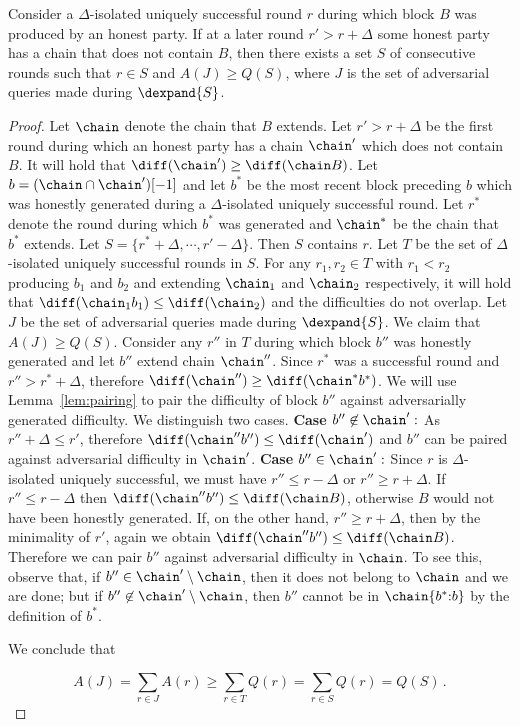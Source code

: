 \begin{lemma}\label{lem:suppression}
  Consider a $\Delta$-isolated uniquely successful round $r$ during which block
  $B$ was produced by an honest party. If at a later round $r' > r + \Delta$
  some honest party has a chain that does not contain $B$, then there exists
  a set $S$ of consecutive rounds such that
  $r \in S$
  and $A(J) \geq Q(S)$, where $J$ is the set of adversarial queries made
  during $\dexpand{S}$.
\end{lemma}
\begin{proof}
  Let $\chain$ denote the chain that $B$ extends.
  Let $r' > r + \Delta$ be the first round during which an honest party has a
  chain $\chain'$ which does not contain $B$.
  It will hold that $\diff(\chain') \geq \diff(\chain B)$.
  Let
  $b = (\chain \cap \chain')[-1]$ and let $b^*$ be the most recent block
  preceding $b$ which was honestly generated during a $\Delta$-isolated uniquely
  successful round.
  Let $r^*$ denote the round during which $b^*$ was generated
  and $\chain^*$ be the chain that $b^*$ extends.
  Let $S = \{r^* + \Delta, \cdots, r' - \Delta\}$.
  Then $S$ contains $r$.
  Let $T$ be the set of $\Delta$-isolated uniquely successful rounds in
  $S$. For any $r_1, r_2 \in T$ with $r_1 < r_2$ producing $b_1$ and $b_2$ and
  extending $\chain_1$ and $\chain_2$ respectively, it will hold that
  $\diff(\chain_1 b_1) \leq \diff(\chain_2)$ and the difficulties do not
  overlap.
  Let $J$ be the set of adversarial queries made during $\dexpand{S}$.
  We claim that $A(J) \geq Q(S)$.
  Consider any $r''$ in $T$
  during which block $b''$ was honestly generated and let $b''$ extend chain $\chain''$.
  Since $r^*$ was a successful round and $r'' > r^* + \Delta$, therefore
  $\diff(\chain'') \geq \diff(\chain^* b^*)$.
  We will use Lemma~\ref{lem:pairing} to pair the difficulty of block $b''$
  against adversarially generated difficulty.
  We distinguish two cases.
  \textbf{Case $b'' \not\in \chain':$} As $r'' + \Delta \leq r'$, therefore
  $\diff(\chain''b'') \leq \diff(\chain')$ and $b''$ can be paired against
  adversarial difficulty in $\chain'$.
  \textbf{Case $b'' \in \chain':$}
  Since $r$ is $\Delta$-isolated uniquely successful, we must have
  $r'' \leq r - \Delta$ or $r'' \geq r + \Delta$.
  If $r'' \leq r - \Delta$ then $\diff(\chain'' b'') \leq \diff(\chain B)$,
  otherwise $B$ would not have been honestly generated.
  If, on the other hand, $r'' \geq r + \Delta$, then by the minimality of
  $r'$, again we obtain
  $\diff(\chain'' b'') \leq \diff(\chain B)$. Therefore we can pair $b''$ against
  adversarial difficulty in $\chain$. To see this, observe that, if $b'' \in
  \chain'\setminus\chain$, then it does not belong to $\chain$ and we are done;
  but if $b'' \not\in \chain'\setminus\chain$, then $b''$ cannot be in
  $\chain\{b^*{:}b\}$ by the definition of $b^*$.

  We conclude that

  \[
  A(J) =
  \sum_{r \in J} A(r) \geq \sum_{r \in T} Q(r) = \sum_{r \in S} Q(r)
  = Q(S)\,.
  \]
\end{proof}


